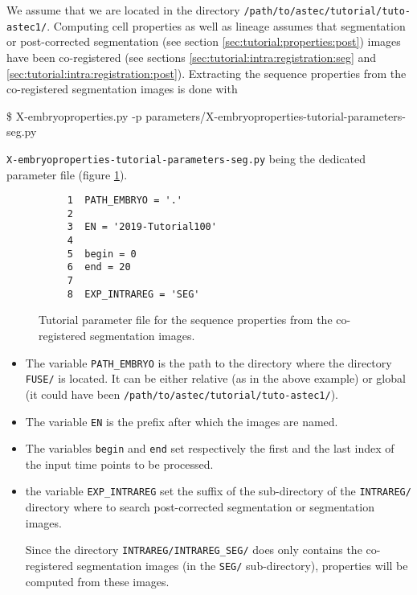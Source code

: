 We assume that we are located in the directory
\texttt{/path/to/astec/tutorial/tuto-astec1/}.
Computing cell properties as well as lineage assumes that
 segmentation or post-corrected segmentation (see section
\ref{sec:tutorial:properties:post}) images have been
co-registered (see sections \ref{sec:tutorial:intra:registration:seg}
and \ref{sec:tutorial:intra:registration:post}). 
Extracting the sequence properties from the co-registered segmentation
images is
done with
\begin{code}{0.8}
  \$ X-embryoproperties.py -p parameters/X-embryoproperties-tutorial-parameters-seg.py
\end{code}
\texttt{X-embryoproperties-tutorial-parameters-seg.py} being the
dedicated parameter file  (figure \ref{fig:tutorial:parameter:properties:seg}).

\begin{figure}
\begin{framed}
\begin{verbatim}
     1	PATH_EMBRYO = '.'
     2	
     3	EN = '2019-Tutorial100'
     4	
     5	begin = 0
     6	end = 20
     7	
     8	EXP_INTRAREG = 'SEG'
\end{verbatim}
\end{framed}
\caption{\label{fig:tutorial:parameter:properties:seg} Tutorial
  parameter file for the sequence properties from the co-registered
  segmentation images.}
\end{figure}

\begin{itemize}
  \itemsep -1ex
  \item The variable \texttt{PATH\_EMBRYO} is the path to the directory where
    the directory \texttt{FUSE/} is located. It can be either relative (as in the
    above example) or
    global (it could have been \texttt{/path/to/astec/tutorial/tuto-astec1/}).
  \item The variable \texttt{EN} is the prefix after which the  images
    are named. 
  \item The variables \texttt{begin} and \texttt{end} set respectively the
    first and the last index of the input time points to be processed.
  \item  the variable \texttt{EXP\_INTRAREG} set the suffix of the
    sub-directory of the \texttt{INTRAREG/} directory where to search
    post-corrected segmentation or segmentation images.

    Since the directory \texttt{INTRAREG/INTRAREG\_SEG/} does only
    contains the co-registered segmentation images (in the
    \texttt{SEG/} sub-directory), properties will be computed from
    these images.
\end{itemize}

